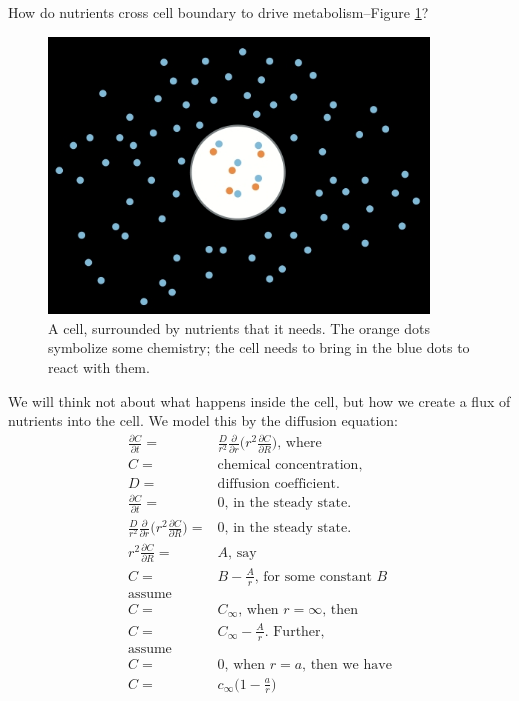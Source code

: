 \documentclass[]{article}
\begin{document}
How do nutrients cross cell boundary to drive metabolism--Figure \ref{fig:Encapsulation1}?
\begin{figure}[H]
	\caption[Metabolism in Cells]{A cell, surrounded by nutrients that it needs. The orange dots symbolize some chemistry; the cell needs to bring in the blue dots to react with them.} \label{fig:Encapsulation1} 
	\includegraphics[width=0.9\textwidth]{Encapsulation1}
\end{figure}

We will think not about what happens inside the cell, but how we create a flux of nutrients into the cell.
We model this by the diffusion equation:
\begin{align*}
\frac{\partial C}{\partial t} =& \frac{D}{r^2} \frac{\partial}{\partial r}\big(r^2 \frac{\partial C}{\partial R} \big) \text{, where}\\
C=& \text{chemical concentration, }\\
D=& \text{diffusion coefficient.}\\
\frac{\partial C}{\partial t} =& 0 \text{, in the steady state.}\\
 \frac{D}{r^2} \frac{\partial}{\partial r}\big(r^2 \frac{\partial C}{\partial R} \big) =& 0 \text{, in the steady state.}\\
 r^2 \frac{\partial C}{\partial R} =& A \text{, say}\\
 C =& B - \frac{A}{r} \text{, for some constant $B$}\\
 \text{assume}& \\
 C =& C_{\infty}\text{, when $r=\infty$, then}\\
 C =& C_{\infty} - \frac{A}{r} \text{. Further, }\\
  \text{assume}& \\
 C =& 0\text{, when $r=a$, then we have}\\
 C =& c_{\infty}\big(1 - \frac{a}{r}\big) 
\end{align*}
\end{document}
